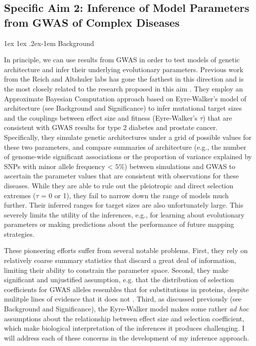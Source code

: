 \documentclass[11pt]{article}
\makeatletter
\renewcommand{\paragraph}{%
  \@startsection{paragraph}{4}%
  {\z@}{1ex \@plus 1ex \@minus .2ex}{-1em}%
  {\normalfont\normalsize\bfseries}%
}
\makeatother
\begin{document}
\subsection*{Specific Aim 2: Inference of Model Parameters from GWAS of Complex Diseases}

\paragraph{Background}

In principle, we can use results from GWAS in order to test models of genetic architecture and infer their underlying evolutionary parameters. Previous work from the Reich and Altshuler labs has gone the farthest in this direction and is the most closely related to the research proposed in this aim \cite{Agarwala:2013bu, Fuchsberger:2016df, Mancuso:2015cp}.  They employ an Approximate Bayesian Computation approach based on Eyre-Walker’s model of architecture\cite{EyreWalker:2010dn} (see Background and Significance) to infer mutational target sizes and the couplings between effect size and fitness (Eyre-Walker’s $\tau$) that are consistent with GWAS results for type 2 diabetes\cite{Agarwala:2013bu,Fuchsberger:2016df} and prostate cancer\cite{Mancuso:2015cp}. Specifically, they simulate genetic architectures under a grid of possible values for these two parameters, and compare summaries of architecture (e.g., the number of genome-wide significant associations\cite{Agarwala:2013bu} or the proportion of variance explained by SNPs with minor allele frequency < $5\%$\cite{Fuchsberger:2016df,Mancuso:2015cp}) between simulations and GWAS to ascertain the parameter values that are consistent with observations for these diseases. While they are able to rule out the pleiotropic and direct selection extremes ($\tau$ = 0 or 1), they fail to narrow down the range of models much further. Their inferred ranges for target sizes are also unfortunately large. This severely limits the utility of the inferences, e.g., for learning about evolutionary parameters or making predictions about the performance of future mapping strategies.

These pioneering efforts suffer from several notable problems. First, they rely on relatively coarse summary statistics that discard a great deal of information, limiting their ability to constrain the parameter space. Second, they make significant and unjustified assumption, e.g. that the distribution of selection coefficients for GWAS alleles resembles that for substitutions in proteins, despite mulitple lines of evidence that it does not \cite{EyreWalker:2007dl,Pickrell:2014bw,Racimo:2014cb}. Third, as discussed previously (see Background and Significance), the Eyre-Walker model makes some rather \textit{ad hoc} assumptions about the relationship between effect size and selection coefficient, which make biological interpretation of the inferences it produces challenging. I will address each of these concerns in the development of my inference approach.
\end{document}
